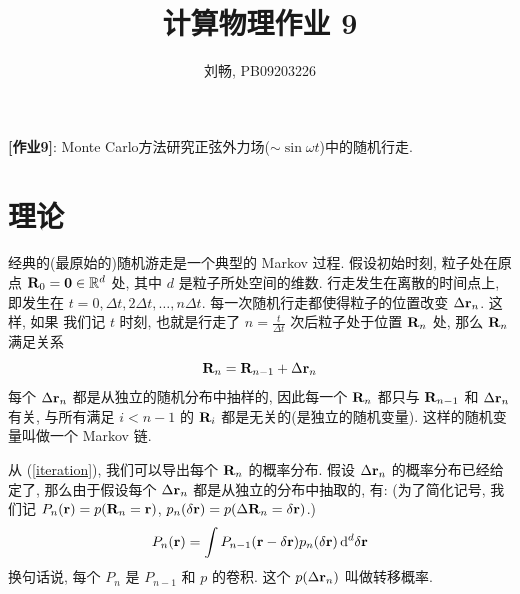 \documentclass{ctexart}
\def\vec#1{{\bf #1}}
\def\dd{{\rm d}}
\begin{document}
\title{计算物理作业 9}
\author{刘畅, PB09203226}
\maketitle

{\bf[作业9]}: Monte Carlo方法研究正弦外力场($\sim\sin\omega t$)中的随机行走.

\section{理论}
经典的(最原始的)随机游走是一个典型的 Markov 过程. 假设初始时刻, 粒子处在原点
$\vec R_0=\vec0 \in\mathbb{R}^d$ 处, 其中 $d$ 是粒子所处空间的维数.
行走发生在离散的时间点上, 即发生在 $t=0,\Delta t,2\Delta t,\ldots, n\Delta t$.
每一次随机行走都使得粒子的位置改变 $\Delta\vec r_n$. 这样, 如果
我们记 $t$ 时刻, 也就是行走了 $n = \frac{t}{\Delta t}$ 次后粒子处于位置
$\vec R_n$ 处, 那么 $\vec R_n$ 满足关系
\begin{equation}\label{iteration}
\vec R_n = \vec R_{n-1} + \Delta \vec r_n
\end{equation}
每个 $\Delta\vec r_n$ 都是从独立的随机分布中抽样的, 因此每一个 $\vec R_n$
都只与 $\vec R_{n-1}$ 和 $\Delta\vec r_n$ 有关,
与所有满足 $i<n-1$ 的 $\vec R_i$ 都是无关的(是独立的随机变量). 这样的随机变量叫做一个
Markov 链.

从 (\ref{iteration}), 我们可以导出每个 $\vec R_n$ 的概率分布. 假设 $\Delta\vec r_n$
的概率分布已经给定了, 那么由于假设每个 $\Delta\vec r_n$ 都是从独立的分布中抽取的, 有:
(为了简化记号, 我们记 $P_n(\vec r) = p(\vec R_n = \vec r)$, $p_n(\delta\vec r) =
p(\Delta\vec R_n = \delta\vec r)$.)
\begin{equation}\label{convolution}
P_n(\vec r) = \int P_{n-1}(\vec r-\delta\vec r) p_n(\delta\vec r)
\,\dd^d\delta\vec r
\end{equation}
换句话说, 每个 $P_n$ 是 $P_{n-1}$ 和 $p$ 的卷积. 这个 $p(\Delta\vec r_n)$ 叫做转移概率.
\end{document}
